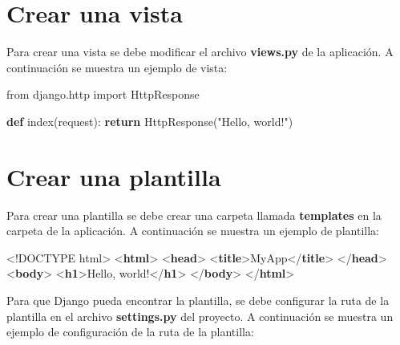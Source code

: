 \documentclass[
  a4paper,
  DIV=11,
  numbers=noendperiod,
  onepage,
  openany]{scrreprt}
\newenvironment{Shaded}{\begin{snugshade}}{\end{snugshade}}
\newcommand{\ControlFlowTok}[1]{\textcolor[rgb]{0.00,0.23,0.31}{\textbf{#1}}}
\newcommand{\DataTypeTok}[1]{\textcolor[rgb]{0.68,0.00,0.00}{#1}}
\newcommand{\ImportTok}[1]{\textcolor[rgb]{0.00,0.46,0.62}{#1}}
\newcommand{\KeywordTok}[1]{\textcolor[rgb]{0.00,0.23,0.31}{\textbf{#1}}}
\newcommand{\NormalTok}[1]{\textcolor[rgb]{0.00,0.23,0.31}{#1}}
\newcommand{\StringTok}[1]{\textcolor[rgb]{0.13,0.47,0.30}{#1}}
\begin{document}
\begin{tcolorbox}
\chapter{Crear una vista}\label{crear-una-vista-1}

Para crear una vista se debe modificar el archivo \textbf{views.py} de
la aplicación. A continuación se muestra un ejemplo de vista:

\begin{Shaded}
\begin{Highlighting}[]
\ImportTok{from}\NormalTok{ django.http }\ImportTok{import}\NormalTok{ HttpResponse}

\KeywordTok{def}\NormalTok{ index(request):}
    \ControlFlowTok{return}\NormalTok{ HttpResponse(}\StringTok{"Hello, world!"}\NormalTok{)}
\end{Highlighting}
\end{Shaded}

\chapter{Crear una plantilla}\label{crear-una-plantilla}

Para crear una plantilla se debe crear una carpeta llamada
\textbf{templates} en la carpeta de la aplicación. A continuación se
muestra un ejemplo de plantilla:

\begin{Shaded}
\begin{Highlighting}[]
\DataTypeTok{\textless{}!DOCTYPE}\NormalTok{ html}\DataTypeTok{\textgreater{}}
\DataTypeTok{\textless{}}\KeywordTok{html}\DataTypeTok{\textgreater{}}
\DataTypeTok{\textless{}}\KeywordTok{head}\DataTypeTok{\textgreater{}}
    \DataTypeTok{\textless{}}\KeywordTok{title}\DataTypeTok{\textgreater{}}\NormalTok{MyApp}\DataTypeTok{\textless{}/}\KeywordTok{title}\DataTypeTok{\textgreater{}}
\DataTypeTok{\textless{}/}\KeywordTok{head}\DataTypeTok{\textgreater{}}
\DataTypeTok{\textless{}}\KeywordTok{body}\DataTypeTok{\textgreater{}}
    \DataTypeTok{\textless{}}\KeywordTok{h1}\DataTypeTok{\textgreater{}}\NormalTok{Hello, world!}\DataTypeTok{\textless{}/}\KeywordTok{h1}\DataTypeTok{\textgreater{}}
\DataTypeTok{\textless{}/}\KeywordTok{body}\DataTypeTok{\textgreater{}}
\DataTypeTok{\textless{}/}\KeywordTok{html}\DataTypeTok{\textgreater{}}
\end{Highlighting}
\end{Shaded}

Para que Django pueda encontrar la plantilla, se debe configurar la ruta
de la plantilla en el archivo \textbf{settings.py} del proyecto. A
continuación se muestra un ejemplo de configuración de la ruta de la
plantilla:


\end{tcolorbox}
\end{document}
